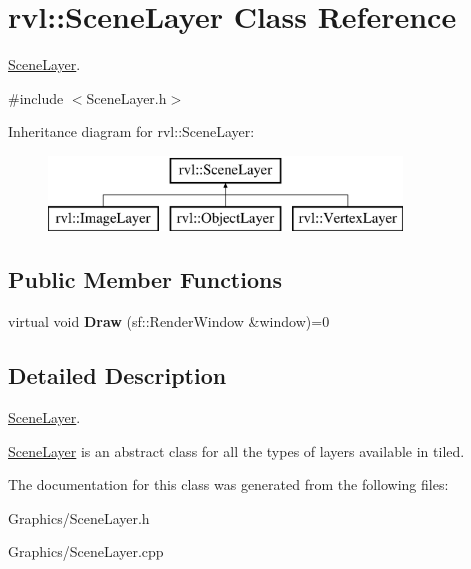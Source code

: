 \hypertarget{classrvl_1_1_scene_layer}{}\section{rvl\+:\+:Scene\+Layer Class Reference}
\label{classrvl_1_1_scene_layer}


\hyperlink{classrvl_1_1_scene_layer}{Scene\+Layer}.  




{\ttfamily \#include $<$Scene\+Layer.\+h$>$}

Inheritance diagram for rvl\+:\+:Scene\+Layer\+:\begin{figure}[H]
\begin{center}
\leavevmode
\includegraphics[height=2.000000cm]{classrvl_1_1_scene_layer}
\end{center}
\end{figure}
\subsection*{Public Member Functions}
\begin{DoxyCompactItemize}
\item 
\mbox{\label{classrvl_1_1_scene_layer_aaaf36766d7c6990f82bad34c7c57259d}} 
virtual void {\bfseries Draw} (sf\+::\+Render\+Window \&window)=0
\end{DoxyCompactItemize}


\subsection{Detailed Description}
\hyperlink{classrvl_1_1_scene_layer}{Scene\+Layer}. 

\hyperlink{classrvl_1_1_scene_layer}{Scene\+Layer} is an abstract class for all the types of layers available in tiled. 

The documentation for this class was generated from the following files\+:\begin{DoxyCompactItemize}
\item 
Graphics/Scene\+Layer.\+h\item 
Graphics/Scene\+Layer.\+cpp\end{DoxyCompactItemize}
